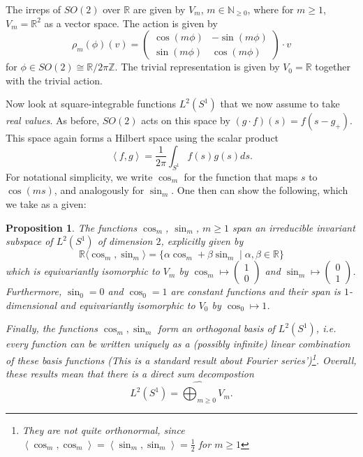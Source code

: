 \documentclass[12pt, a4paper]{article}
\theoremstyle{plain}
\newtheorem{pro}{Proposition}[section]
\theoremstyle{definition}
\theoremstyle{remark}
\newcommand{\N}{\mathds{N}}
\newcommand{\Z}{\mathds{Z}}
\newcommand{\R}{\mathds{R}}
\begin{document}
The irreps of $SO(2)$ over $\R$ are given by $V_m$, $m \in \N_{\geq 0}$, where for $m \geq 1$, $V_m = \R^2$ as a vector space. The action is given by
\begin{equation*}
\rho_m(\phi)(v) =
\begin{pmatrix}
\cos(m \phi) & -\sin(m \phi) \\
\sin(m \phi) & \cos(m \phi)
\end{pmatrix} \cdot v
\end{equation*}
for $\phi \in SO(2) \cong \R/{2 \pi \Z}$. The trivial representation is given by $V_0 = \R$ together with the trivial action.

Now look at square-integrable functions $L^2(S^1)$ that we now assume to take \emph{real values}. As before, $SO(2)$ acts on this space by $(g \cdot f)(s) = f(s - g_{+})$. This space again forms a Hilbert space using the scalar product
\begin{equation*}
\left\langle f, g\right\rangle = \frac{1}{2 \pi} \int_{S^1} f(s) g(s) ds.
\end{equation*}
For notational simplicity, we write $\cos_m$ for the function that maps $s$ to $\cos(ms)$, and analogously for $\sin_m$. One then can show the following, which we take as a given:

\begin{pro}\label{description_L_1}
The functions $\cos_m$, $\sin_m$, $m \geq 1$ span an irreducible invariant subspace of $L^2(S^1)$ of dimension $2$, explicitly given by
\begin{equation*}
\R\langle \cos_m, \sin_m \rangle = \{\alpha \cos_m + \beta \sin_m \mid \alpha, \beta \in \R \}
\end{equation*}
which is equivariantly isomorphic to $V_m$ by $\cos_m \mapsto \begin{pmatrix} 1 \\ 0\end{pmatrix}$ and $\sin_m \mapsto \begin{pmatrix} 0 \\ 1 \end{pmatrix}$. Furthermore, $\sin_0 = 0$ and $\cos_0 = 1$ are constant functions and their span is $1$-dimensional and equivariantly isomorphic to $V_0$ by $\cos_0 \mapsto 1$. 

Finally, the functions $\cos_m, \sin_m$ form an orthogonal basis of $L^2(S^1)$, i.e. every function can be written uniquely as a (possibly infinite) linear combination of these basis functions (This is a standard result about Fourier series')\footnote{They are \emph{not quite} orthonormal, since $\left\langle \cos_m, \cos_m \right\rangle = \left\langle \sin_m, \sin_m\right\rangle = \frac{1}{2}$ for $m \geq 1$}. Overall, these results mean that there is a direct sum decompostion
\begin{equation*}
L^2(S^1) = \widehat{\bigoplus_{m \geq 0}} V_m.
\end{equation*}
\end{pro}
\end{document}
